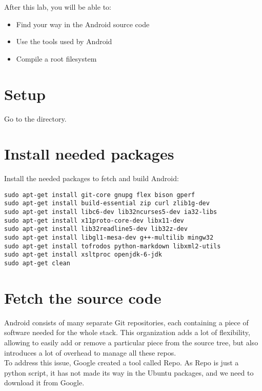 
After this lab, you will be able to:
\begin{itemize}
  \item Find your way in the Android source code
  \item Use the tools used by Android
  \item Compile a root filesystem
\end{itemize}

\section{Setup}

Go to the  directory.


\section{Install needed packages}

Install the needed packages to fetch and build Android:

\begin{verbatim}
sudo apt-get install git-core gnupg flex bison gperf
sudo apt-get install build-essential zip curl zlib1g-dev
sudo apt-get install libc6-dev lib32ncurses5-dev ia32-libs
sudo apt-get install x11proto-core-dev libx11-dev
sudo apt-get install lib32readline5-dev lib32z-dev
sudo apt-get install libgl1-mesa-dev g++-multilib mingw32
sudo apt-get install tofrodos python-markdown libxml2-utils
sudo apt-get install xsltproc openjdk-6-jdk
sudo apt-get clean
\end{verbatim}

\section{Fetch the source code}

Android consists of many separate Git repositories, each containing a piece
of software needed for the whole stack. This organization adds a lot of
flexibility, allowing to easily add or remove a particular piece from the source
tree, but also introduces a lot of overhead to manage all these repos.\\

To address this issue, Google created a tool called Repo. As Repo is just a
python script, it has not made its way in the Ubuntu packages, and we need to
download it from Google.\\

